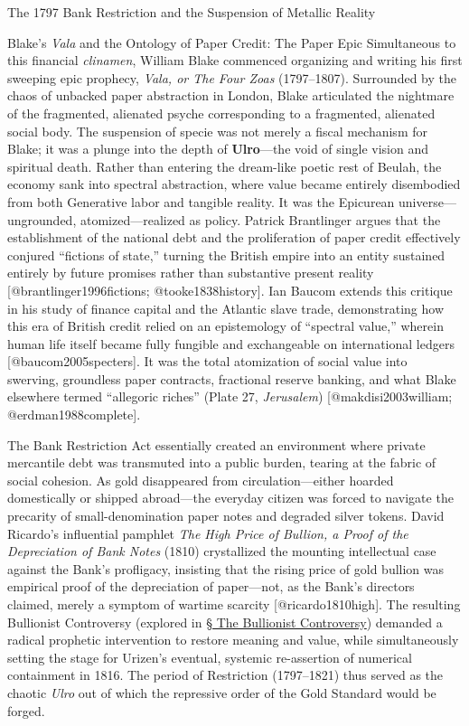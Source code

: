 \documentclass[
  ignorenonframetext,
]{beamer}
\begin{document}
\begin{frame}{The 1797 Bank Restriction and the Suspension of Metallic
Reality}
\begin{block}{Blake's \emph{Vala} and the Ontology of Paper Credit: The
Paper Epic}
\protect{}\label{blakes-vala-and-the-ontology-of-paper-credit-the-paper-epic}
Simultaneous to this financial \emph{clinamen}, William Blake commenced
organizing and writing his first sweeping epic prophecy, \emph{Vala, or
The Four Zoas} (1797--1807). Surrounded by the chaos of unbacked paper
abstraction in London, Blake articulated the nightmare of the
fragmented, alienated psyche corresponding to a fragmented, alienated
social body. The suspension of specie was not merely a fiscal mechanism
for Blake; it was a plunge into the depth of \textbf{Ulro}---the void of
single vision and spiritual death. Rather than entering the dream-like
poetic rest of Beulah, the economy sank into spectral abstraction, where
value became entirely disembodied from both Generative labor and
tangible reality. It was the Epicurean universe---ungrounded,
atomized---realized as policy. Patrick Brantlinger argues that the
establishment of the national debt and the proliferation of paper credit
effectively conjured ``fictions of state,'' turning the British empire
into an entity sustained entirely by future promises rather than
substantive present reality {[}@brantlinger1996fictions;
@tooke1838history{]}. Ian Baucom extends this critique in his study of
finance capital and the Atlantic slave trade, demonstrating how this era
of British credit relied on an epistemology of ``spectral value,''
wherein human life itself became fully fungible and exchangeable on
international ledgers {[}@baucom2005specters{]}. It was the total
atomization of social value into swerving, groundless paper contracts,
fractional reserve banking, and what Blake elsewhere termed ``allegoric
riches'' (Plate 27, \emph{Jerusalem}) {[}@makdisi2003william;
@erdman1988complete{]}.

The Bank Restriction Act essentially created an environment where
private mercantile debt was transmuted into a public burden, tearing at
the fabric of social cohesion. As gold disappeared from
circulation---either hoarded domestically or shipped abroad---the
everyday citizen was forced to navigate the precarity of
small-denomination paper notes and degraded silver tokens. David
Ricardo's influential pamphlet \emph{The High Price of Bullion, a Proof
of the Depreciation of Bank Notes} (1810) crystallized the mounting
intellectual case against the Bank's profligacy, insisting that the
rising price of gold bullion was empirical proof of the depreciation of
paper---not, as the Bank's directors claimed, merely a symptom of
wartime scarcity {[}@ricardo1810high{]}. The resulting Bullionist
Controversy (explored in \hyperlink{sec-bullionist-controversy}{§ The
Bullionist Controversy}) demanded a radical prophetic intervention to
restore meaning and value, while simultaneously setting the stage for
Urizen's eventual, systemic re-assertion of numerical containment in
1816. The period of Restriction (1797--1821) thus served as the chaotic
\emph{Ulro} out of which the repressive order of the Gold Standard would
be forged.
\end{block}
\end{frame}
\end{document}
